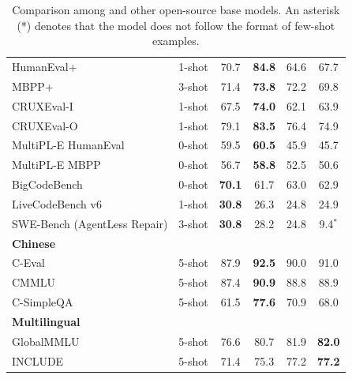 \begin{table}[htbp]
{\begin{tabular}{l c | c | c c c}
    HumanEval+ & 1-shot & 70.7 & \textbf{84.8} & 64.6 & 67.7 \\
    MBPP+ & 3-shot & 71.4 & \textbf{73.8} & 72.2 & 69.8 \\
    CRUXEval-I & 1-shot & 67.5 & \textbf{74.0} & 62.1 & 63.9 \\
    CRUXEval-O & 1-shot & 79.1 & \textbf{83.5} & 76.4 & 74.9 \\
    MultiPL-E HumanEval & 0-shot & 59.5 & \textbf{60.5} & 45.9 & 45.7 \\
    MultiPL-E MBPP & 0-shot & 56.7 & \textbf{58.8} & 52.5 & 50.6 \\
    BigCodeBench & 0-shot & \textbf{70.1} & 61.7 & 63.0 & 62.9 \\
    LiveCodeBench v6 & 1-shot & \textbf{30.8} & 26.3 & 24.8 & 24.9 \\
    SWE-Bench {\tiny (AgentLess Repair)} & 3-shot & \textbf{30.8} & 28.2 & 24.8 & 9.4$^*$ \\
    \midrule
    \multicolumn{6}{l}{\textbf{Chinese}} \\
    C-Eval & 5-shot & 87.9 & \textbf{92.5} & 90.0 & 91.0 \\
    CMMLU & 5-shot & 87.4 & \textbf{90.9} & 88.8 & 88.9 \\
    C-SimpleQA & 5-shot & 61.5 & \textbf{77.6} & 70.9 & 68.0 \\
    \midrule
    \multicolumn{6}{l}{\textbf{Multilingual}} \\
    GlobalMMLU & 5-shot & 76.6 & 80.7 & 81.9 & \textbf{82.0} \\
    INCLUDE & 5-shot & 71.4 & 75.3 & 77.2 & \textbf{77.2} \\
    \bottomrule
    \end{tabular}
    }
    \caption{
        Comparison among \mimoflash{} and other open-source base models. An asterisk (*) denotes that the model does not follow the format of few-shot examples.
    }
    \label{tab:base_eval}
\end{table}


